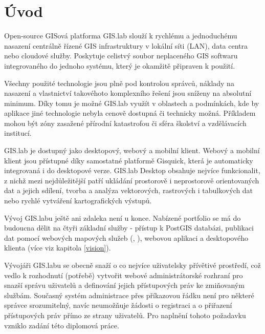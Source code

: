 \chapter{Úvod}
\label{1-uvod}


Open-source GISová platforma GIS.lab slouží k rychlému a jednoduchému
nasazení centrálně řízené GIS infrastruktury v lokální síti (LAN),
data centra nebo cloudové služby. Poskytuje celistvý soubor
neplaceného GIS softwaru integrovaného do jednoho systému, který je
okamžitě připraven k použití.
 
Všechny použité technologie jsou plně pod kontrolou správců, náklady
na nasazení a vlastnictví takovéhoto komplexního řešení jsou sníženy
na absolutní minimum. Díky tomu je možné GIS.lab využít v oblastech a
podmínkách, kde by aplikace jiné technologie nebyla cenově dostupná či
technicky možná. Příkladem mohou být zóny zasažené přírodní
katastrofou či sféra školství a vzdělávacích institucí.

GIS.lab je dostupný jako desktopový, webový a mobilní klient. Webový a
mobilní klient jsou přístupné díky samostatné platformě Gisquick,
která je automaticky integrovaná i do desktopové verze. GIS.lab
Desktop obsahuje nejvíce funkcionalit, z nichž mezi nejdůležitější
patří ukládání prostorově i neprostorově orientovaných dat a jejich
sdílení, tvorba a analýza vektorových, rastrových i tabulkových dat
nebo rychlé vytváření kartografických výstupů.

Vývoj GIS.labu ještě ani zdaleka není u konce. Nabízené portfolio se
má do budoucna dělit na čtyři základní služby - přístup k PostGIS
databázi, publikaci dat pomocí webových mapových služeb (,
), webovou aplikaci a desktopového klienta (více viz kapitola
\ref{vision}).


Vývojáři GIS.labu se obecně snaží o co nejvíce uživatelsky přívětivé
prostředí, což vedlo k rozhodnutí (potřebě) vytvořit webové
administrátorské rozhraní pro snazší správu uživatelů a definování
jejich přístupových práv ke zmiňovaným službám. Současný systém
administrace přes příkazovou řádku není pro některé správce
srozumitelný, navíc neumožňuje žádosti o registraci a o přiřazení
přístupových práv přímo ze strany uživatelů. Pro naplnění tohoto
požadavku vzniklo zadání této diplomová práce.

